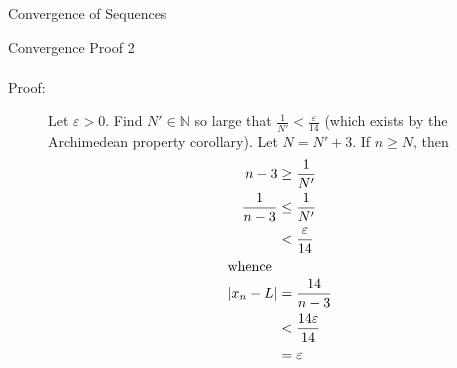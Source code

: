 \documentclass[8pt]{extarticle}
\newcommand{\N}{\mathbb{N}}
\begin{document}
\begin{problem}{Convergence of Sequences}
\begin{problem}{Convergence Proof 2}
\begin{align*}
      \end{align*}
      \begin{description}
        \item[Proof:] Let $\varepsilon > 0$. Find $N' \in\N$ so large that $\frac{1}{N'} < \frac{\varepsilon}{14}$ (which exists by the Archimedean property corollary). Let $N = N' + 3$. If $n \geq N$, then
          \begin{align*}
            n-3 &\geq \frac{1}{N'}\\
            \frac{1}{n-3} &\leq \frac{1}{N'}\\
                          &< \frac{\varepsilon}{14}\\
                          \shortintertext{whence}
            |x_n - L| &= \frac{14}{n-3}\\
                      &< \frac{14\varepsilon}{14}\\
                      &= \varepsilon
          \end{align*}
      \end{description}
    \end{problem}
  \end{problem}
\end{document}
